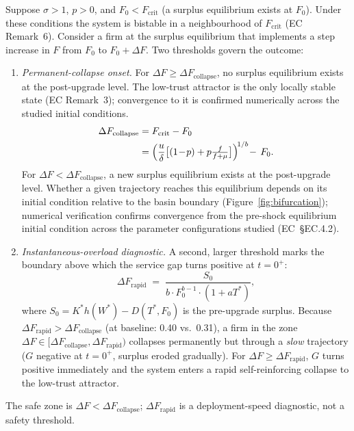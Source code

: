 \documentclass[msom,dblanonrev]{informs4}
\begin{document}
\begin{theorem}\label{thm:cliff}
Suppose $\sigma > 1$, $p > 0$, and $F_0 < F_{\mathrm{crit}}$ (a surplus equilibrium exists at $F_0$). Under these conditions the system is bistable in a neighbourhood of $F_{\mathrm{crit}}$ (EC Remark~6). Consider a firm at the surplus equilibrium that implements a step increase in $F$ from $F_0$ to $F_0 + \Delta F$. Two thresholds govern the outcome:
\begin{enumerate}
    \item[(i)] \emph{Permanent-collapse onset.} For $\Delta F \geq \Delta F_{\mathrm{collapse}}$, no surplus equilibrium exists at the post-upgrade level. The low-trust attractor is the only locally stable state (EC Remark~3); convergence to it is confirmed numerically across the studied initial conditions.
    \begin{align*}
       \Delta F_{\mathrm{collapse}} &= F_{\mathrm{crit}} - F_0 \\
         &= \Bigl(\frac{u}{\delta}\bigl[(1\!-\!p)+p\tfrac{f}{f+\mu}\bigr]\Bigr)^{\!1/b} \!-\, F_0.
    \end{align*}
    For $\Delta F < \Delta F_{\mathrm{collapse}}$, a new surplus equilibrium exists at the post-upgrade level. Whether a given trajectory reaches this equilibrium depends on its initial condition relative to the basin boundary (Figure~\ref{fig:bifurcation}); numerical verification confirms convergence from the pre-shock equilibrium initial condition across the parameter configurations studied (EC~\S EC.4.2).
    \item[(ii)] \emph{Instantaneous-overload diagnostic.} A second, larger threshold marks the boundary above which the service gap turns positive at $t=0^+$:
    \begin{equation}\label{eq:DFrapid}
        \Delta F_{\mathrm{rapid}} \;=\; \frac{S_0}{b\cdot F_0^{b-1}\cdot(1+aT^*)},
    \end{equation}
    where $S_0 = K^*h(W^*) - D(T^*,F_0)$ is the pre-upgrade surplus. Because $\Delta F_{\mathrm{rapid}} > \Delta F_{\mathrm{collapse}}$ (at baseline: 0.40 vs.\ 0.31), a firm in the zone $\Delta F \in [\Delta F_{\mathrm{collapse}},\Delta F_{\mathrm{rapid}})$ collapses permanently but through a \emph{slow} trajectory ($G$ negative at $t=0^+$, surplus eroded gradually). For $\Delta F \geq \Delta F_{\mathrm{rapid}}$, $G$ turns positive immediately and the system enters a rapid self-reinforcing collapse to the low-trust attractor.
\end{enumerate}
The safe zone is $\Delta F < \Delta F_{\mathrm{collapse}}$; $\Delta F_{\mathrm{rapid}}$ is a deployment-speed diagnostic, not a safety threshold.
\end{theorem}
\end{document}
